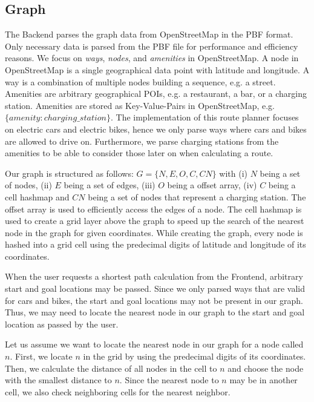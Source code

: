 \documentclass[a4paper]{article}
\begin{document}
\subsection{Graph}
The Backend parses the graph data from OpenStreetMap in the PBF format.
Only necessary data is parsed from the PBF file for performance and efficiency reasons.
We focus on \textit{ways}, \textit{nodes}, and \textit{amenities} in OpenStreetMap. A node in OpenStreetMap is a single geographical data point with latitude and longitude. A way is a combination of multiple nodes building a sequence, e.g. a street.
Amenities are arbitrary geographical POIs, e.g. a restaurant, a bar, or a charging station.
Amenities are stored as Key-Value-Pairs in OpenStreetMap, e.g. $\lbrace amenity: charging\_station \rbrace$.
The implementation of this route planner focuses on electric cars and electric bikes, hence we only parse ways where cars and bikes are allowed to drive on.
Furthermore, we parse charging stations from the amenities to be able to consider those later on when calculating a route.\par\medskip
Our graph is structured as follows: $G = \lbrace N, E, O, C, CN \rbrace$ with (i) $N$ being a set of nodes, (ii) $E$ being a set of edges, (iii) $O$ being a offset array, (iv) $C$ being a cell hashmap and $CN$ being a set of nodes that represent a charging station.
The offset array is used to efficiently access the edges of a node. The cell hashmap is used to create a grid layer above the graph to speed up the search of the nearest node in the graph for given coordinates.
While creating the graph, every node is hashed into a grid cell using the predecimal digits of latitude and longitude of its coordinates.\par\smallskip
When the user requests a shortest path calculation from the Frontend, arbitrary start and goal locations may be passed. 
Since we only parsed ways that are valid for cars and bikes, the start and goal locations may not be present in our graph.
Thus, we may need to locate the nearest node in our graph to the start and goal location as passed by the user.\par\smallskip
Let us assume we want to locate the nearest node in our graph for a node called $n$.
First, we locate $n$ in the grid by using the predecimal digits of its coordinates. 
Then, we calculate the distance of all nodes in the cell to $n$ and choose the node with the smallest distance to $n$.
Since the nearest node to $n$ may be in another cell, we also check neighboring cells for the nearest neighbor.\par\medskip
\end{document}
